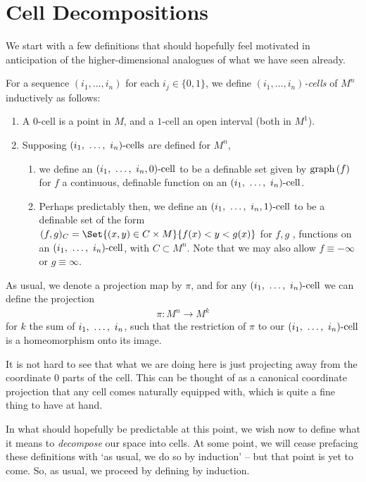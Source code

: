 \section{Cell Decompositions}

We start with a few definitions that should hopefully feel motivated in anticipation of the higher-dimensional analogues of what we have seen already.

\begin{definition}[Cells in $M^n$]
  For a sequence $(i_1, \hdots, i_n)$ for each $i_j \in \{0, 1\}$, we define $(i_1, \hdots, i_n)$\emph{-cells} of $M^n$ inductively as follows:
  \begin{enumerate}
    \item A $0$-cell is a point in $M$, and a $1$-cell an open interval (both in $M^1$).
    \item Supposing $(i_1, \ \hdots, \ i_n)\textrm{-cells}$ are defined for $M^n$,
	\begin{enumerate}
	  \item we define an $(i_1, \ \hdots, \ i_n, 0)\textrm{-cell}$ to be a definable set given by $\operatorname{graph}\left(f\right)$ for $f$ a continuous, definable function on an $(i_1, \ \hdots, \ i_n)\textrm{-cell}$.
	  \item Perhaps predictably then, we define an $(i_1, \ \hdots, \ i_n, 1)\textrm{-cell}$ to be a definable set of the form $(f, g)_C = \Set{(x, y) \in C \times M}{f(x) < y < g(x)}$ for $f, g$ \cont,  functions on an $(i_1, \ \hdots, \ i_n)\textrm{-cell}$, with $C \subset M^n$. Note that we may also allow $f \equiv - \infty$ or $g \equiv \infty$.
	\end{enumerate}

  \end{enumerate}

  As usual, we denote a projection map by $\pi$, and for any $(i_1, \ \hdots, \ i_n)\textrm{-cell}$ we can define the projection
  \begin{align*}
    \pi \colon M^n \to M^k
  \end{align*}
  for $k$ the sum of $i_1, \ \hdots, \ i_n$, such that the restriction of $\pi$ to our $(i_1, \ \hdots, \ i_n)\textrm{-cell}$ is a homeomorphism onto its image.
\end{definition}

It is not hard to see that what we are doing here is just projecting away from the coordinate 0 parts of the cell. This can be thought of as a canonical coordinate projection that any cell comes naturally equipped with, which is quite a fine thing to have at hand.

In what should hopefully be predictable at this point, we wish now to define what it means to \emph{decompose} our space into cells. At some point, we will cease prefacing these definitions with `as usual, we do so by induction' -- but that point is yet to come. So, as usual, we proceed by defining \cds by induction.

